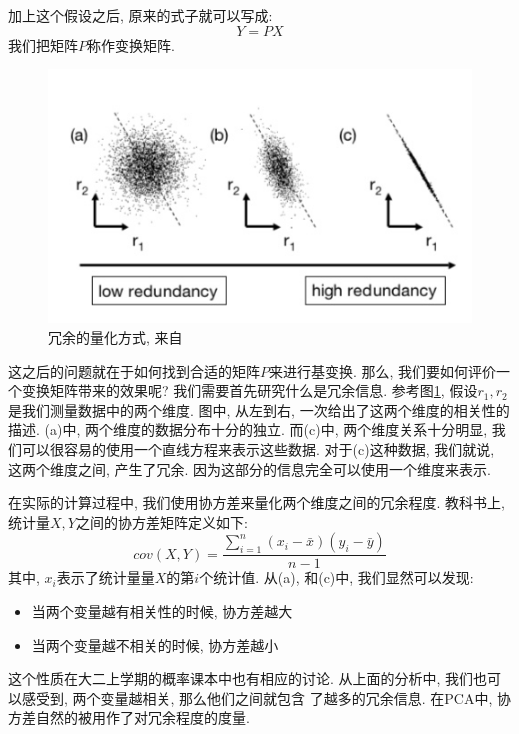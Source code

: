 \documentclass[fleqn,10pt]{SelfArx} %
\begin{document}
		加上这个假设之后, 原来的式子就可以写成:
		\begin{equation}
			Y = PX
		\end{equation}
		我们把矩阵$P$称作变换矩阵.
		\begin{figure}[ht] \centering
			\includegraphics[width=\linewidth]{example1}
			\caption{冗余的量化方式, 来自\cite{princetonPCA:25:2003}}
			\label{fig:example1}
		\end{figure}
		这之后的问题就在于如何找到合适的矩阵$P$来进行基变换.
		那么, 我们要如何评价一个变换矩阵带来的效果呢?
		我们需要首先研究什么是冗余信息.
		参考图\ref{fig:example1}, 假设$r_1, r_2$是我们测量数据中的两个维度.
		图中, 从左到右, 一次给出了这两个维度的相关性的描述. 
		(a)中, 两个维度的数据分布十分的独立.
		而(c)中, 两个维度关系十分明显, 我们可以很容易的使用一个直线方程来表示这些数据.
		对于(c)这种数据, 我们就说, 这两个维度之间, 产生了冗余.
		因为这部分的信息完全可以使用一个维度来表示.
		
		在实际的计算过程中, 我们使用协方差来量化两个维度之间的冗余程度.
		教科书上, 统计量$X, Y$之间的协方差矩阵定义如下:
		\begin{equation}
			cov(X, Y) = \frac{\sum_{i=1}^n(x_i - \bar{x})(y_i - \bar{y})}{n-1}
			\label{eq:cov1}
		\end{equation}
		其中, $x_i$表示了统计量量$X$的第$i$个统计值.
		从(a), 和(c)中, 我们显然可以发现:
		\begin{itemize}
			\item 当两个变量越有相关性的时候, 协方差越大
			\item 当两个变量越不相关的时候, 协方差越小
		\end{itemize}
		这个性质在大二上学期的概率课本中也有相应的讨论.
		从上面的分析中, 我们也可以感受到, 两个变量越相关, 那么他们之间就包含
		了越多的冗余信息. 在PCA中, 协方差自然的被用作了对冗余程度的度量.
\end{document}
